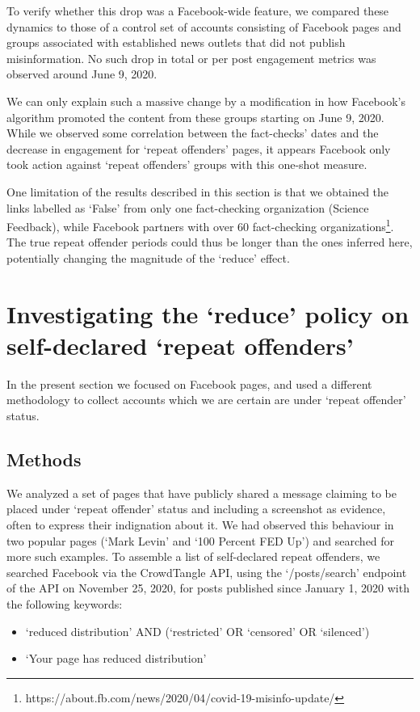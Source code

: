\documentclass[11pt,a4paper]{article}
\begin{document}
To verify whether this drop was a Facebook-wide feature, we compared these dynamics to those of a control set of accounts consisting of Facebook pages and groups associated with established news outlets that did not publish misinformation.
No such drop in total or per post engagement metrics was observed around June 9, 2020.

We can only explain such a massive change by a modification in how Facebook’s algorithm promoted the content from these groups starting on June 9, 2020.
While we observed some correlation between the fact-checks' dates and the decrease in engagement for `repeat offenders' pages, it appears Facebook only took action against `repeat offenders' groups with this one-shot measure.

One limitation of the results described in this section is that we obtained the links labelled as `False' from only one fact-checking organization (Science Feedback), while Facebook partners with over 60 fact-checking organizations\footnote{https://about.fb.com/news/2020/04/covid-19-misinfo-update/}.
The true repeat offender periods could thus be longer than the ones inferred here, potentially changing the magnitude of the ‘reduce’ effect.

\section{Investigating the `reduce' policy on self-declared `repeat offenders'}

In the present section we focused on Facebook pages, and used a different methodology to collect accounts which we are certain are under `repeat offender' status. 

\subsection{Methods}

We analyzed a set of pages that have publicly shared a message claiming to be placed under `repeat offender' status and including a screenshot as evidence, often to express their indignation about it. 
We had observed this behaviour in two popular pages (`Mark Levin' and `100 Percent FED Up') and searched for more such examples. 
To assemble a list of self-declared repeat offenders, we searched Facebook via the CrowdTangle API, using the `/posts/search' endpoint of the API on November 25, 2020, for posts published since January 1, 2020 with the following keywords:
\begin{itemize}
\item `reduced distribution' AND (`restricted' OR `censored' OR `silenced')
\item `Your page has reduced distribution'
\end{itemize}
\end{document}
